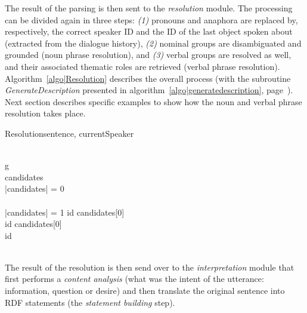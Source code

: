 The result of the parsing is then sent to the \emph{resolution} module.  The
processing can be divided again in three steps: {\it(1)} pronouns and anaphora
are replaced by, respectively, the correct speaker ID and the ID of the last
object spoken about (extracted from the dialogue history), {\it(2)} nominal
groups are disambiguated and grounded (noun phrase resolution), and {\it(3)}
verbal groups are resolved as well, and their associated thematic roles are
retrieved (verbal phrase resolution). Algorithm~\ref{algo|Resolution} describes
the overall process (with the subroutine \emph{GenerateDescription} presented
in algorithm~\ref{algo|generatedescription},
page~\pageref{algo|generatedescription}).  Next section describes specific
examples to show how the noun and verbal phrase resolution takes place.

\small
\begin{pseudocode}[ruled]{Resolution}{sentence, currentSpeaker}
\label{algo|Resolution}

 \GETS {} \\

\FOREACH g \in {} \DO 
\BEGIN
    \GETS {} \\
   candidates \GETS {} \\
   
   \IF \left|{candidates}\right| = 0 \THEN
    \BEGIN
       \\
      \EXIT \\
    \END
   \ELSEIF \left|{candidates}\right| = 1 \THEN
      id \GETS candidates[0] \\

   \ELSE
      \BEGIN
        \IF {} \THEN
          id \GETS candidates[0] \\
        \ELSE
          id \GETS {} \\ %
      \END \\
\END
\end{pseudocode}
\normalsize

The result of the resolution is then send over to the \emph{interpretation}
module that first performs a \emph{content analysis} (what was the intent of
the utterance: information, question or desire) and then translate the original
sentence into RDF statements (the \emph{statement building} step).

